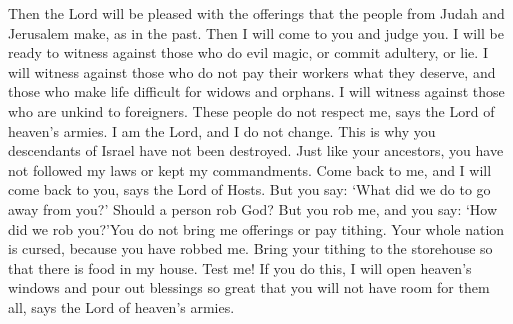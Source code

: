 \bverse \iffalse Then shall the offering of Judah and Jerusalem be pleasant unto the Lord, as in the days of old, and as in former years. \fi
Then the Lord will be pleased with the offerings that the people from Judah and Jerusalem make, as in the past.
\bverse \iffalse And I will come near to you to judgment; and I will be a swift witness against the sorcerers, and against the adulterers, and against false swearers, and against those that oppress the hireling in his wages, the widow and the fatherless, and that turn aside the stranger, and fear not me, saith the Lord of Hosts. \fi
Then I will come to you and judge you. I will be ready to witness against those who do evil magic, or commit adultery, or lie. I will witness against those who do not pay their workers what they deserve, and those who make life difficult for widows and orphans. I will witness against those who are unkind to foreigners. These people do not respect me, says the Lord of heaven's armies.
\bverse \iffalse For I am the Lord, I change not; therefore ye sons of Jacob are not consumed. \fi
I am the Lord, and I do not change. This is why you descendants of Israel have not been destroyed.
\bverse \iffalse Even from the days of your fathers ye are gone away from mine ordinances, and have not kept them. Return unto me and I will return unto you, saith the Lord of Hosts. But ye say: Wherein shall we return? \fi
Just like your ancestors, you have not followed my laws or kept my commandments. Come back to me, and I will come back to you, says the Lord of Hosts. But you say: \lq What did we do to go away from you?\rq
\bverse \iffalse Will a man rob God? Yet ye have robbed me. But ye say: Wherein have we robbed thee? In tithes and offerings. \fi
Should a person rob God? But you rob me, and you say: \lq How did we rob you?\rq You do not bring me offerings or pay tithing.
\bverse \iffalse Ye are cursed with a curse, for ye have robbed me, even this whole nation. \fi
Your whole nation is cursed, because you have robbed me.
\bverse \iffalse Bring ye all the tithes into the storehouse, that there may be meat in my house; and prove me now herewith, saith the Lord of Hosts, if I will not open you the windows of heaven, and pour you out a blessing that there shall not be room enough to receive it. \fi
Bring your tithing to the storehouse so that there is food in my house. Test me! If you do this, I will open heaven's windows and pour out blessings so great that you will not have room for them all, says the Lord of heaven's armies.
